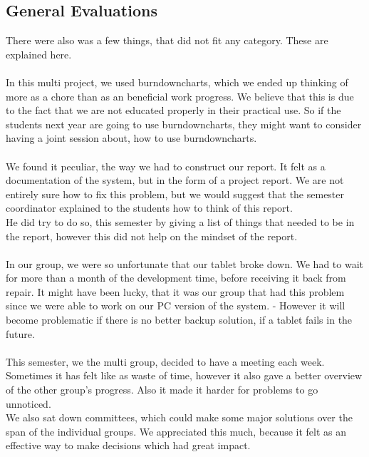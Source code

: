 \subsection{General Evaluations}
There were also was a few things, that did not fit any category. These are explained here.\\
\\
In this multi project, we used burndowncharts, which we ended up thinking of more as a chore than as an beneficial work progress. We believe that this is due to the fact that we are not educated properly in their practical use. So if the students next year are going to use burndowncharts, they might want to consider having a joint session about, how to use burndowncharts.\\
\\
We found it peculiar, the way we had to construct our report. It felt as a documentation of the system, but in the form of a project report. We are not entirely sure how to fix this problem, but we would suggest that the semester coordinator explained to the students how to think of this report.\\
He did try to do so, this semester by giving a list of things that needed to be in the report, however this did not help on the mindset of the report.\\
\\
In our group, we were so unfortunate that our tablet broke down. We had to wait for more than a month of the development time, before receiving it back from repair. It might have been lucky, that it was our group that had this problem since we were able to work on our PC version of the system. - However it will become problematic if there is no better backup solution, if a tablet fails in the future.\\
\\
This semester, we the multi group, decided to have a meeting each week. Sometimes it has felt like as waste of time, however it also gave a better overview of the other group's progress. Also it made it harder for problems to go unnoticed.\\
We also sat down committees, which could make some major solutions over the span of the individual groups. We appreciated this much, because it felt as an effective way to make decisions which had great impact.


